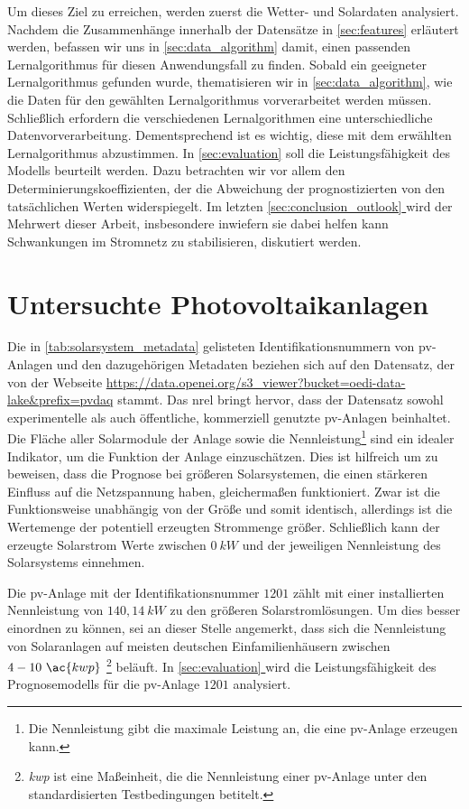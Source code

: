 \documentclass[12pt, a4paper]{article}
\newcommand*{\fullref}[1]{\hyperref[{#1}]{\autoref*{#1} \textit{\nameref*{#1}}}}
\begin{document}
Um dieses Ziel zu erreichen, werden zuerst die Wetter- und Solardaten analysiert. Nachdem die Zusammenhänge innerhalb der Datensätze in \autoref{sec:features} erläutert werden, befassen wir uns in \autoref{sec:data_algorithm} damit, einen passenden Lernalgorithmus für diesen Anwendungsfall zu finden. Sobald ein geeigneter Lernalgorithmus gefunden wurde, thematisieren wir in \autoref{sec:data_algorithm}, wie die Daten für den gewählten Lernalgorithmus vorverarbeitet werden müssen. Schließlich erfordern die verschiedenen Lernalgorithmen eine unterschiedliche Datenvorverarbeitung. Dementsprechend ist es wichtig, diese mit dem erwählten Lernalgorithmus abzustimmen. In \autoref{sec:evaluation} soll die Leistungsfähigkeit des Modells beurteilt werden. Dazu betrachten wir vor allem den Determinierungskoeffizienten, der die Abweichung der prognostizierten von den tatsächlichen Werten widerspiegelt. Im letzten \fullref{sec:conclusion_outlook} wird der Mehrwert dieser Arbeit, insbesondere inwiefern sie dabei helfen kann Schwankungen im Stromnetz zu stabilisieren, diskutiert werden.
 
\newpage

\section{Untersuchte Photovoltaikanlagen}

Die in \autoref{tab:solarsystem_metadata} gelisteten Identifikationsnummern von \ac{pv}-Anlagen und den dazugehörigen Metadaten beziehen sich auf den Datensatz, der von der Webseite \url{https://data.openei.org/s3_viewer?bucket=oedi-data-lake&prefix=pvdaq} \newline stammt. Das \ac{nrel} bringt hervor, dass der Datensatz sowohl experimentelle als auch öffentliche, kommerziell genutzte \ac{pv}-Anlagen beinhaltet. Die Fläche aller Solarmodule der Anlage sowie die Nennleistung\footnote{Die Nennleistung gibt die maximale Leistung an, die eine \ac{pv}-Anlage erzeugen kann.} sind ein idealer Indikator, um die Funktion der Anlage einzuschätzen. Dies ist hilfreich um zu beweisen, dass die Prognose bei größeren Solarsystemen, die einen stärkeren Einfluss auf die Netzspannung haben, gleichermaßen funktioniert. Zwar ist die Funktionsweise unabhängig von der Größe und somit identisch, allerdings ist die Wertemenge der potentiell erzeugten Strommenge größer. Schließlich kann der erzeugte Solarstrom Werte zwischen $0 \ kW$ und der jeweiligen Nennleistung des Solarsystems einnehmen. 

Die \ac{pv}-Anlage mit der Identifikationsnummer $1201$ zählt mit einer installierten Nennleistung von $140,14 \ kW$ zu den größeren Solarstromlösungen. Um dies besser einordnen zu können, sei an dieser Stelle angemerkt, dass sich die Nennleistung von Solaranlagen auf meisten deutschen Einfamilienhäusern zwischen $4 - 10 \ \ac{kwp}$ \footnote{\textit{\ac{kwp}} ist eine Maßeinheit, die die Nennleistung einer \ac{pv}-Anlage unter den standardisierten Testbedingungen betitelt.} beläuft. In \fullref{sec:evaluation} wird die Leistungsfähigkeit des Prognosemodells für die \ac{pv}-Anlage $1201$ analysiert.
\end{document}
